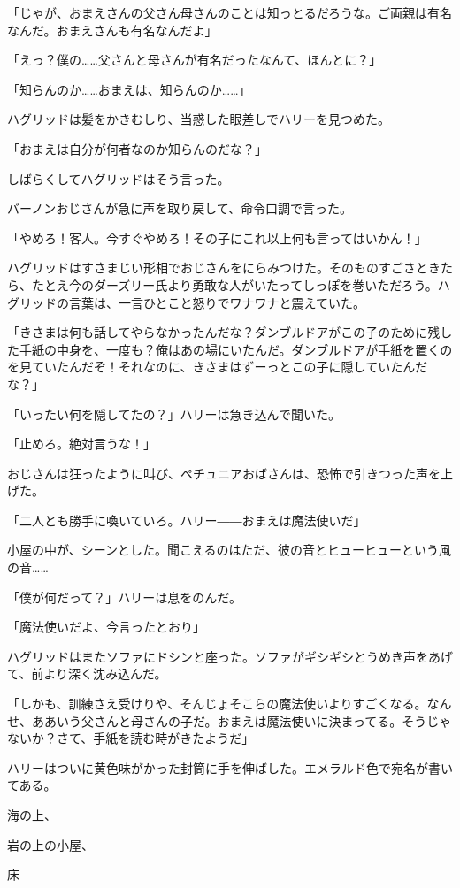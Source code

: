 \documentclass[10pt,a4paper]{article}
\begin{document}
\begin{CJK}{UTF8}{min}
「じゃが、おまえさんの父さん母さんのことは知っとるだろうな。ご両親は有名なんだ。おまえさんも有名なんだよ」

「えっ？僕の……父さんと母さんが有名だったなんて、ほんとに？」

「知らんのか……おまえは、知らんのか……」

ハグリッドは髪をかきむしり、当惑した眼差しでハリーを見つめた。

「おまえは自分が何者なのか知らんのだな？」

しばらくしてハグリッドはそう言った。

バーノンおじさんが急に声を取り戻して、命令口調で言った。

「やめろ！客人。今すぐやめろ！その子にこれ以上何も言ってはいかん！」

ハグリッドはすさまじい形相でおじさんをにらみつけた。そのものすごさときたら、たとえ今のダーズリー氏より勇敢な人がいたってしっぽを巻いただろう。ハグリッドの言葉は、一言ひとこと怒りでワナワナと震えていた。

「きさまは何も話してやらなかったんだな？ダンブルドアがこの子のために残した手紙の中身を、一度も？俺はあの場にいたんだ。ダンブルドアが手紙を置くのを見ていたんだぞ！それなのに、きさまはずーっとこの子に隠していたんだな？」

「いったい何を隠してたの？」ハリーは急き込んで聞いた。

「止めろ。絶対言うな！」

おじさんは狂ったように叫び、ペチュニアおばさんは、恐怖で引きつった声を上げた。

「二人とも勝手に喚いていろ。ハリー――おまえは魔法使いだ」

小屋の中が、シーンとした。聞こえるのはただ、彼の音とヒューヒューという風の音……

「僕が何だって？」ハリーは息をのんだ。

「魔法使いだよ、今言ったとおり」

ハグリッドはまたソファにドシンと座った。ソファがギシギシとうめき声をあげて、前より深く沈み込んだ。

「しかも、訓練さえ受けりや、そんじょそこらの魔法使いよりすごくなる。なんせ、ああいう父さんと母さんの子だ。おまえは魔法使いに決まってる。そうじゃないか？さて、手紙を読む時がきたようだ」

ハリーはついに黄色味がかった封筒に手を伸ばした。エメラルド色で宛名が書いてある。



海の上、

岩の上の小屋、

床


\end{CJK}
\end{document}

